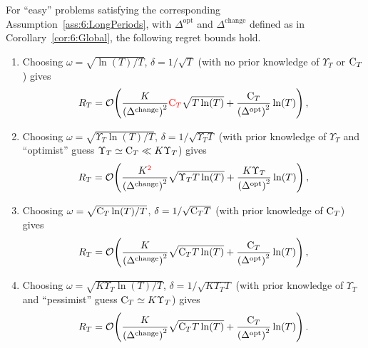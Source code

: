 \begin{corollary}\label{cor:6:Local}
    For ``easy'' problems satisfying the corresponding Assumption~\ref{ass:6:LongPeriods},
    with $\Delta^{\text{opt}}$ and ${\Delta}^{\text{change}}$ defined as in Corollary~\ref{cor:6:Global}, the following regret bounds hold.

    \begin{enumerate}
        \item
        Choosing $\omega = \sqrt{\ln(T) / T}$, $\delta = 1 / \sqrt{T}$ (with no prior knowledge of $\Upsilon_T$ or $\mathrm{C}_T$) gives
        \begin{equation}
            R_T = \mathop{}\mathopen{}\mathcal{O}\mathopen{}\left(\frac{K}{\left(\Delta^{\text{change}}\right)^2} \textcolor{red}{\mathrm{C}_T}\sqrt{T\ln(T)} + \frac{\mathrm{C}_T}{\left(\Delta^{\text{opt}}\right)^2} \ln(T)\right),
        \end{equation}

        \item
        Choosing $\omega = \sqrt{\Upsilon_T\ln(T) / T}$, $\delta = 1 / \sqrt{\Upsilon_T T}$ (with prior knowledge of $\Upsilon_T$ and ``optimist'' guess $\Upsilon_T \simeq \mathrm{C}_T \ll K \Upsilon_T$) gives
        \begin{equation}
            R_T = \mathop{}\mathopen{}\mathcal{O}\mathopen{}\left(\frac{K^{\textcolor{red}{2}}}{\left({\Delta}^{\text{change}}\right)^2}\sqrt{\Upsilon_T T\ln(T)} + \frac{K\Upsilon_T}{\left(\Delta^{\text{opt}}\right)^2}\ln(T)\right),
        \end{equation}

        \item
        Choosing $\omega = \sqrt{\mathrm{C}_T\ln(T) / T}$, $\delta = 1 / \sqrt{\mathrm{C}_T T}$ (with prior knowledge of $\mathrm{C}_T$) gives
        \begin{equation}
            R_T = \mathop{}\mathopen{}\mathcal{O}\mathopen{}\left(\frac{K}{\left({\Delta}^{\text{change}}\right)^2}\sqrt{\mathrm{C}_T T\ln(T)} + \frac{\mathrm{C}_T}{\left(\Delta^{\text{opt}}\right)^2}\ln(T)\right),
        \end{equation}

        \item
        Choosing $\omega = \sqrt{K\Upsilon_T\ln(T) / T}$, $\delta = 1 / \sqrt{K\Upsilon_T T}$ (with prior knowledge of $\Upsilon_T$ and ``pessimist'' guess $\mathrm{C}_T \simeq K \Upsilon_T$) gives
        \begin{equation}
            R_T = \mathop{}\mathopen{}\mathcal{O}\mathopen{}\left(\frac{K}{\left({\Delta}^{\text{change}}\right)^2}\sqrt{\mathrm{C}_T T\ln(T)} + \frac{\mathrm{C}_T}{\left(\Delta^{\text{opt}}\right)^2} \ln(T)\right).
        \end{equation}
    \end{enumerate}
    \vspace*{-20pt}  %
\end{corollary}


